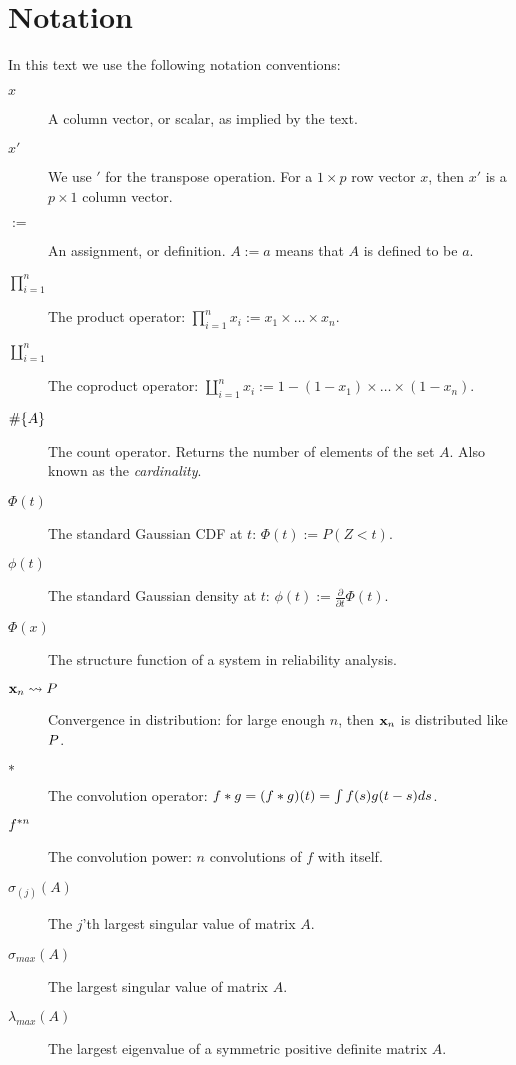 


\chapter{Notation}
\label{apx:notation}

In this text we use the following notation conventions:
\begin{description}
\item[$x$] A column vector, or scalar, as implied by the text. 
\item[$x'$] We use $'$ for the transpose operation. 
For a $1\times p$ row vector $x$, then $x'$ is a $p \times 1$ column vector.
\item[$:=$] An assignment, or definition. $A:=a$ means that $A$ is defined to be $a$. 
\item[$\prod_{i=1}^{n}$] The product operator: $\prod_{i=1}^{n} x_i:= x_1 \times \dots \times x_n$.
\item[$\coprod_{i=1}^{n}$] The coproduct operator: $\coprod_{i=1}^{n} x_i:= 1-(1-x_1) \times \dots \times (1-x_n)$.
\item[$\#\{ A \}$] The count operator. Returns the number of elements of the set $A$. Also known as the \emph{cardinality}.
\item[$\Phi(t)$] The standard Gaussian CDF at $t$: $\Phi(t):= P(Z<t)$.
\item[$\phi(t)$] The standard Gaussian density at $t$: $\phi(t):= \frac{\partial}{\partial t}\Phi(t)$.
\item[$\Phi(x)$] The structure function of a system in reliability analysis.
\item[$\mathbf{x}_n \rightsquigarrow P$] Convergence in distribution: for large enough $n$, then $\mathbf{x}_n$ is distributed like $P$.
\item[$\ast$] The convolution operator: $f \ast g=(f \ast g)(t)=\int f(s) g(t-s) ds$.
\item[$f^{\ast n}$] The convolution power: $n$ convolutions of $f$ with itself.
\item[$\sigma_{(j)}(A)$] The $j$'th largest singular value of matrix $A$. 
\item[$\sigma_{max}(A)$] The largest singular value of matrix $A$. 
\item[$\lambda_{max}(A)$] The largest eigenvalue of a symmetric positive definite matrix $A$.  
\end{description}


